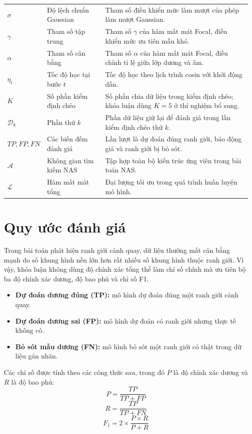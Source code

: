 {\begin{longtable}{L{2.4cm}L{5.0cm}L{6.0cm}}
$\sigma$ & Độ lệch chuẩn Gaussian & Tham số điều khiển mức làm mượt của phép làm mượt Gaussian. \\
$\gamma$ & Tham số tập trung & Tham số $\gamma$ của hàm mất mát Focal, điều khiển mức ưu tiên mẫu khó. \\
$\alpha$ & Tham số cân bằng & Tham số $\alpha$ của hàm mất mát Focal, điều chỉnh tỉ lệ giữa lớp dương và âm. \\
$\eta_t$ & Tốc độ học tại bước $t$ & Tốc độ học theo lịch trình cosin với khởi động dần. \\
$K$ & Số phần kiểm định chéo & Số phần chia dữ liệu trong kiểm định chéo; khóa luận dùng $K=5$ ở thí nghiệm bổ sung. \\
$\mathcal{D}_k$ & Phần thứ $k$ & Phần dữ liệu giữ lại để đánh giá trong lần kiểm định chéo thứ $k$. \\
$TP,FP,FN$ & Các biến đếm đánh giá & Lần lượt là dự đoán đúng ranh giới, báo động giả và ranh giới bị bỏ sót. \\
$\mathcal{A}$ & Không gian tìm kiếm NAS & Tập hợp toàn bộ kiến trúc ứng viên trong bài toán NAS. \\
$\mathcal{L}$ & Hàm mất mát tổng & Đại lượng tối ưu trong quá trình huấn luyện mô hình. \\
\bottomrule
\end{longtable}
}

\section{Quy ước đánh giá}

Trong bài toán phát hiện ranh giới cảnh quay, dữ liệu thường mất cân bằng mạnh do số khung hình nền lớn hơn rất nhiều số khung hình thuộc ranh giới. Vì vậy, khóa luận không dùng độ chính xác tổng thể làm chỉ số chính mà ưu tiên bộ ba độ chính xác dương, độ bao phủ và chỉ số F1.

\begin{itemize}
    \item \textbf{Dự đoán dương đúng (TP):} mô hình dự đoán đúng một ranh giới cảnh quay.
    \item \textbf{Dự đoán dương sai (FP):} mô hình dự đoán có ranh giới nhưng thực tế không có.
    \item \textbf{Bỏ sót mẫu dương (FN):} mô hình bỏ sót một ranh giới có thật trong dữ liệu gán nhãn.
\end{itemize}

Các chỉ số được tính theo các công thức sau, trong đó $P$ là độ chính xác dương và $R$ là độ bao phủ:
\begin{equation}
    P = \frac{TP}{TP + FP}
\end{equation}
\begin{equation}
    R = \frac{TP}{TP + FN}
\end{equation}
\begin{equation}
    F_1 = 2 \times \frac{P \times R}{P + R}
\end{equation}

